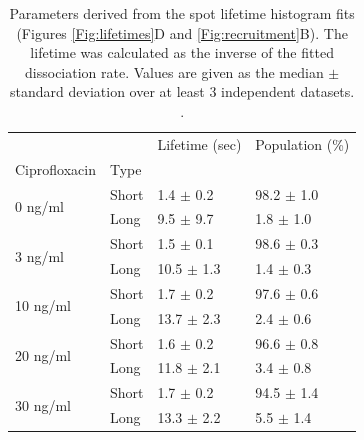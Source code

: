 \begin{table}[htbp]
    \centering
    \caption{Parameters derived from the spot lifetime histogram fits (Figures \ref{Fig:lifetimes}D and \ref{Fig:recruitment}B). The lifetime was calculated as the inverse of the fitted dissociation rate. Values are given as the median $\pm$ standard deviation over at least 3 independent datasets. . }
    \begin{tabular}{llll}
        \toprule
         &  & Lifetime (sec) & Population (\%) \\
        Ciprofloxacin & Type &  &  \\
        \midrule
        \multirow[t]{2}{*}{0 ng/ml} & Short & 1.4 $\pm$ 0.2 & 98.2 $\pm$ 1.0 \\
         & Long & 9.5 $\pm$ 9.7 & 1.8 $\pm$ 1.0 \\
        \cline{1-4}
        \multirow[t]{2}{*}{3 ng/ml} & Short & 1.5 $\pm$ 0.1 & 98.6 $\pm$ 0.3 \\
         & Long & 10.5 $\pm$ 1.3 & 1.4 $\pm$ 0.3 \\
        \cline{1-4}
        \multirow[t]{2}{*}{10 ng/ml} & Short & 1.7 $\pm$ 0.2 & 97.6 $\pm$ 0.6 \\
         & Long & 13.7 $\pm$ 2.3 & 2.4 $\pm$ 0.6 \\
        \cline{1-4}
        \multirow[t]{2}{*}{20 ng/ml} & Short & 1.6 $\pm$ 0.2 & 96.6 $\pm$ 0.8 \\
         & Long & 11.8 $\pm$ 2.1 & 3.4 $\pm$ 0.8 \\
        \cline{1-4}
        \multirow[t]{2}{*}{30 ng/ml} & Short & 1.7 $\pm$ 0.2 & 94.5 $\pm$ 1.4 \\
         & Long & 13.3 $\pm$ 2.2 & 5.5 $\pm$ 1.4 \\
        \cline{1-4}
        \bottomrule
        \end{tabular}
    \label{tab:fit_results}
\end{table}

